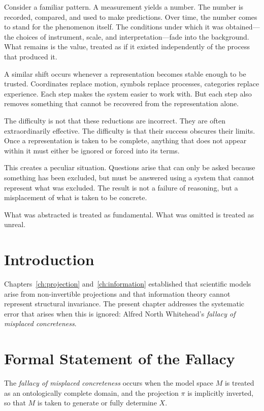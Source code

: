\documentclass[11pt,openany]{book}
\begin{document}
Consider a familiar pattern. A measurement yields a number. The number is recorded, compared, and used to make predictions. Over time, the number comes to stand for the phenomenon itself. The conditions under which it was obtained—the choices of instrument, scale, and interpretation—fade into the background. What remains is the value, treated as if it existed independently of the process that produced it.

A similar shift occurs whenever a representation becomes stable enough to be trusted. Coordinates replace motion, symbols replace processes, categories replace experience. Each step makes the system easier to work with. But each step also removes something that cannot be recovered from the representation alone.

The difficulty is not that these reductions are incorrect. They are often extraordinarily effective. The difficulty is that their success obscures their limits. Once a representation is taken to be complete, anything that does not appear within it must either be ignored or forced into its terms.

This creates a peculiar situation. Questions arise that can only be asked because something has been excluded, but must be answered using a system that cannot represent what was excluded. The result is not a failure of reasoning, but a misplacement of what is taken to be concrete.

What was abstracted is treated as fundamental. What was omitted is treated as unreal.

\section{Introduction}
\label{sec:introduction-misplaced}

Chapters~\ref{ch:projection} and~\ref{ch:information}
established that scientific models arise from
non-invertible projections and that information theory
cannot represent structural invariance. The present chapter
addresses the systematic error that arises when this is
ignored: Alfred North Whitehead's \emph{fallacy of
misplaced concreteness}.

\section{Formal Statement of the Fallacy}
\label{sec:formal-statement}

\begin{definition}
\label{def:misplaced}
The \emph{fallacy of misplaced concreteness} occurs when
the model space $M$ is treated as an ontologically complete
domain, and the projection $\pi$ is implicitly inverted, so
that $M$ is taken to generate or fully determine $X$.
\end{definition}
\end{document}
